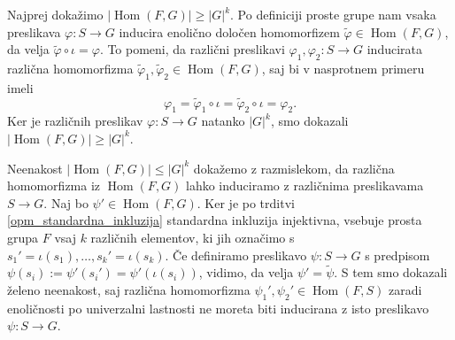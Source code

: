 \begin{dokaz}
  Najprej dokažimo $\lvert \operatorname{Hom}(F, G) \rvert \ge \lvert G \rvert^{k}$.
Po definiciji proste grupe nam vsaka preslikava $\varphi: S \to  G$ inducira enolično določen homomorfizem $\tilde{\varphi} \in \operatorname{Hom}(F, G)$, da velja $\tilde{\varphi} \circ  \iota = \varphi$.
To pomeni, da različni preslikavi $\varphi_1, \varphi_2 : S \to  G$ inducirata različna homomorfizma $\tilde{\varphi}_1 , \tilde{\varphi}_2 \in \operatorname{Hom}(F, G)$, saj bi v nasprotnem primeru imeli \begin{equation*}
\varphi_1 = \tilde{\varphi}_1 \circ  \iota = \tilde{\varphi}_2 \circ  \iota = \varphi_2.
\end{equation*}  
Ker je različnih preslikav $\varphi : S \to G$ natanko $\lvert G \rvert^{k}$, smo dokazali $\lvert \operatorname{Hom}(F, G) \rvert \ge \lvert G \rvert^{k}$.

Neenakost $\lvert \operatorname{Hom}(F, G) \rvert \le \lvert G \rvert^{k}$ dokažemo z razmislekom, da različna homomorfizma iz $\operatorname{Hom}(F, G)$ lahko induciramo z različnima preslikavama $S \to G$.
Naj bo $\psi' \in \operatorname{Hom}(F, G)$. Ker je po trditvi \ref{opm_standardna_inkluzija} standardna inkluzija injektivna, vsebuje prosta grupa $F$ vsaj $k$ različnih elementov, ki jih označimo s $s_1' = \iota(s_1), \ldots, s_k' = \iota(s_k)$.
Če definiramo preslikavo $\psi : S \to G$ s predpisom $\psi(s_i) := \psi'(s_i') = \psi'(\iota(s_i))$, vidimo, da velja $\psi' = \tilde{\psi}$. S tem smo dokazali želeno neenakost, saj različna homomorfizma $\psi_1', \psi_2' \in  \operatorname{Hom}(F, S)$ zaradi enoličnosti po univerzalni lastnosti ne moreta biti
inducirana z isto preslikavo $\psi : S \to  G$.
\end{dokaz}


